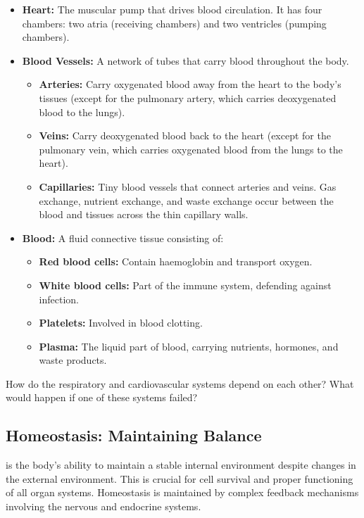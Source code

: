 \begin{itemize}
    \item \textbf{Heart:} The muscular pump that drives blood circulation.  It has four chambers: two atria (receiving chambers) and two ventricles (pumping chambers).
    \item \textbf{Blood Vessels:} A network of tubes that carry blood throughout the body.
        \begin{itemize}
            \item \textbf{Arteries:} Carry oxygenated blood away from the heart to the body's tissues (except for the pulmonary artery, which carries deoxygenated blood to the lungs).
            \item \textbf{Veins:} Carry deoxygenated blood back to the heart (except for the pulmonary vein, which carries oxygenated blood from the lungs to the heart).
            \item \textbf{Capillaries:} Tiny blood vessels that connect arteries and veins.  Gas exchange, nutrient exchange, and waste exchange occur between the blood and tissues across the thin capillary walls.
        \end{itemize}
    \item \textbf{Blood:}  A fluid connective tissue consisting of:
        \begin{itemize}
            \item \textbf{Red blood cells:}  Contain haemoglobin and transport oxygen.
            \item \textbf{White blood cells:} Part of the immune system, defending against infection.
            \item \textbf{Platelets:}  Involved in blood clotting.
            \item \textbf{Plasma:} The liquid part of blood, carrying nutrients, hormones, and waste products.
        \end{itemize}
\end{itemize}

\begin{stopandthink}
How do the respiratory and cardiovascular systems depend on each other? What would happen if one of these systems failed?
\end{stopandthink}

\subsection{Homeostasis: Maintaining Balance}

 is the body's ability to maintain a stable internal environment despite changes in the external environment. This is crucial for cell survival and proper functioning of all organ systems.  Homeostasis is maintained by complex feedback mechanisms involving the nervous and endocrine systems.

